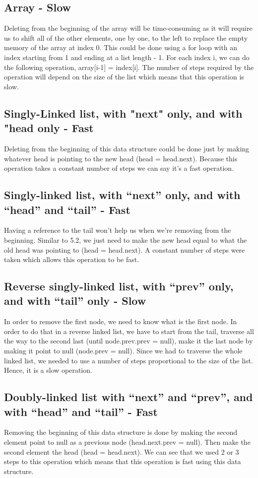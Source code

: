 \documentclass{article}
\begin{document}
\subsection{Array - Slow}
Deleting from the beginning of the array will be time-consuming as it will require us to shift all of the other elements, one by one, to the left to replace the empty memory of the array at index 0. This could be done using a for loop with an index starting from 1 and ending at a list length - 1. For each index i, we can do the following operation, array[i-1] = index[i]. The number of steps required by the operation will depend on the size of the list which means that this operation is slow.

\subsection{Singly-Linked list, with "next" only, and with "head only - Fast}
Deleting from the beginning of this data structure could be done just by making whatever head is pointing to the new head (head = head.next). Because this operation takes a constant number of steps we can say it's a fast operation.

\subsection{Singly-linked list, with “next” only, and with “head” and “tail” - Fast}
Having a reference to the tail won't help us when we're removing from the beginning. Similar to 5.2, we just need to make the new head equal to what the old head was pointing to (head = head.next). A constant number of steps were taken which allows this operation to be fast.

\subsection{Reverse singly-linked list, with “prev” only, and with “tail” only - Slow}
In order to remove the first node, we need to know what is the first node. In order to do that in a reverse linked list, we have to start from the tail, traverse all the way to the second last (until node.prev.prev = null), make it the last node by making it point to null (node.prev = null). Since we had to traverse the whole linked list, we needed to use a number of steps proportional to the size of the list. Hence, it is a slow operation.

\subsection{Doubly-linked list with “next” and “prev”, and with “head” and “tail” - Fast}
Removing the beginning of this data structure is done by making the second element point to null as a previous node (head.next.prev = null). Then make the second element the head (head = head.next). We can see that we used 2 or 3 steps to this operation which means that this operation is fast using this data structure.
\end{document}
